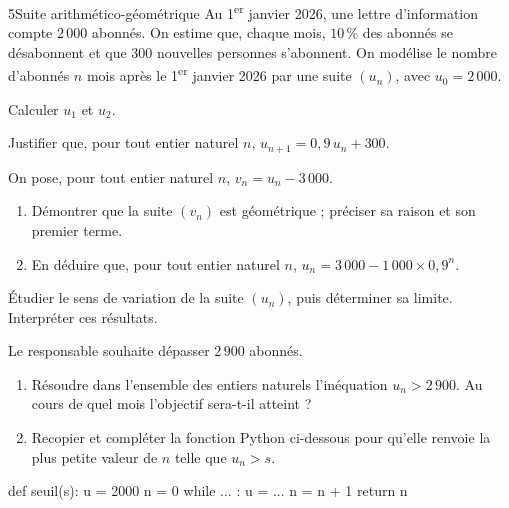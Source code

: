 \begin{exoBac}{5}{Suite arithmético-géométrique}
Au 1\textsuperscript{er} janvier 2026, une lettre d'information compte $2\,000$ abonnés. On estime que, chaque mois, $10\,\%$ des
abonnés se désabonnent et que $300$ nouvelles personnes s'abonnent. On modélise le nombre d'abonnés $n$ mois après le
1\textsuperscript{er} janvier 2026 par une suite $(u_n)$, avec $u_0=2\,000$.
\begin{questions}
  \item Calculer $u_1$ et $u_2$.
  \item Justifier que, pour tout entier naturel $n$, $u_{n+1}=0{,}9\,u_n+300$.
  \item On pose, pour tout entier naturel $n$, $v_n=u_n-3\,000$.
    \begin{enumerate}[label=\alph*),leftmargin=1.4em,itemsep=0.4mm,topsep=0.4mm]
      \item Démontrer que la suite $(v_n)$ est géométrique ; préciser sa raison et son premier terme.
      \item En déduire que, pour tout entier naturel $n$, $u_n=3\,000-1\,000\times0{,}9^{n}$.
    \end{enumerate}
  \item Étudier le sens de variation de la suite $(u_n)$, puis déterminer sa limite. Interpréter ces résultats.
  \item Le responsable souhaite dépasser $2\,900$ abonnés.
    \begin{enumerate}[label=\alph*),leftmargin=1.4em,itemsep=0.4mm,topsep=0.4mm]
      \item Résoudre dans l'ensemble des entiers naturels l'inéquation $u_n>2\,900$. Au cours de quel mois l'objectif sera-t-il atteint ?
      \item Recopier et compléter la fonction Python ci-dessous pour qu'elle renvoie la plus petite valeur de $n$ telle que $u_n>s$.
    \end{enumerate}
\begin{python}
def seuil(s):
    u = 2000
    n = 0
    while ... :
        u = ...
        n = n + 1
    return n
\end{python}
\end{questions}
\end{exoBac}

